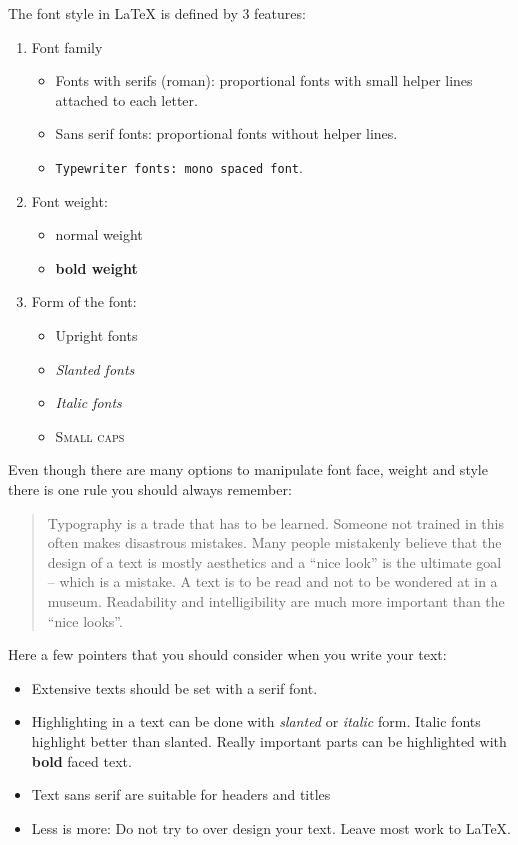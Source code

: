 \documentclass[11pt, a4paper]{article}
\newcommand{\ltx}{\LaTeX}
\begin{document}
The font style in \ltx{} is defined by 3 features:

\begin{enumerate}
\item Font family
\begin{itemize}
\item Fonts with serifs (roman): proportional fonts with small helper lines attached to each letter.
\item \textsf{Sans serif fonts: proportional fonts without helper lines}.
\item \texttt{Typewriter fonts: mono spaced font}.
\end{itemize}
\item Font weight:
\begin{itemize}
\item normal weight
\item \textbf{bold weight}
\end{itemize}
\item Form of the font:
\begin{itemize}
\item Upright fonts
\item \textsl{Slanted fonts}
\item \textit{Italic fonts}
\item \textsc{Small caps}
\end{itemize}
\end{enumerate}

Even though there are many options to manipulate font face, weight and style there is one rule you should always remember:
\begin{quote}
Typography is a trade that has to be learned. Someone not trained in this often makes disastrous mistakes. Many people mistakenly believe that the design of a text is mostly aesthetics and a ``nice look'' is the ultimate goal -- which is a mistake. A text is to be read and not to be wondered at in a museum. Readability and intelligibility are much more important than the ``nice looks''.
\end{quote}

\noindent Here a few pointers that you should consider when you write your text:
\begin{itemize}
\item[\ding{43}] Extensive texts should be set with a serif font.
\item[\ding{43}] Highlighting in a text can be done with \textsl{slanted} or \textit{italic} form. Italic fonts highlight better than slanted. Really important parts can be highlighted with \textbf{bold} faced text.
\item[\ding{43}]  \textsf{Text sans serif are suitable for headers and titles}
\item[\ding{43}] Less is more: Do not try to over design your text. Leave most work to \ltx.
\end{itemize}
\end{document}
